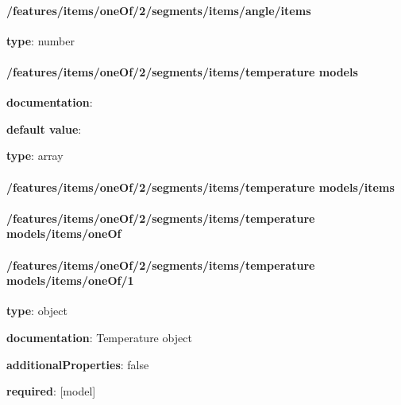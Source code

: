 \begin{itemized}
\paragraph{/features/items/oneOf/2/segments/items/angle/items} \begin{itemized}
\item {\bf type}: number
\end{itemized}\end{itemized}\paragraph{/features/items/oneOf/2/segments/items/temperature models} \begin{itemized}
\item {\bf documentation}: 
\item {\bf default value}: 
\item {\bf type}: array
\paragraph{/features/items/oneOf/2/segments/items/temperature models/items} \begin{itemized}
\end{itemized}\end{itemized}\paragraph{/features/items/oneOf/2/segments/items/temperature models/items/oneOf} \begin{itemized}
\end{itemized}\paragraph{/features/items/oneOf/2/segments/items/temperature models/items/oneOf/1} \begin{itemized}
\item {\bf type}: object
\item {\bf documentation}: Temperature object
\item {\bf additionalProperties}: false
\item {\bf required}: [model]\end{itemized}

